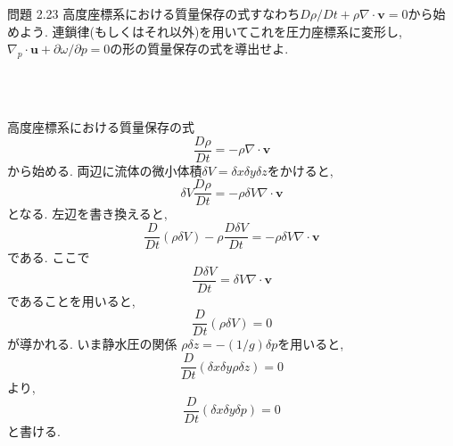 \documentclass[a4j,12pt,openbib,oneside,dvipdfmx]{jarticle}
\def\theequation{\arabic{chapter}.\arabic{equation}}
\def\thepage{\arabic{page}}
\begin{document}
\def\theequation{\arabic{equation}}
\setcounter{equation}{0}
\renewcommand{\thepage}{223-\arabic{page}}
\setcounter{page}{1}

\begin{itembox}[l]{問題 2.23}
高度座標系における質量保存の式すなわち$D\rho/Dt+\rho\nabla\cdot\bm{v}=0$から始めよう. 連鎖律(もしくはそれ以外)を用いてこれを圧力座標系に変形し, $\nabla_p\cdot\bm{u}+\partial{\omega}/\partial{p}=0$の形の質量保存の式を導出せよ.
\end{itembox}
\\
\\
\par
高度座標系における質量保存の式
\begin{equation}
  \frac{D\rho}{Dt}=-\rho\nabla\cdot\bm{v} \label{mas}
\end{equation}
から始める. 両辺に流体の微小体積$\delta{V}=\delta{x}\delta{y}\delta{z}$をかけると,
\begin{equation}
  \delta{V}\frac{D\rho}{Dt}=-\rho\delta{V}\nabla\cdot\bm{v}
\end{equation}
となる. 左辺を書き換えると, 
\begin{equation}
  \frac{D}{Dt}(\rho\delta{V})-\rho\frac{D\delta{V}}{Dt}=-\rho\delta{V}\nabla\cdot\bm{v}
\end{equation}
である. ここで
\begin{equation}
  \frac{D\delta{V}}{Dt}=\delta{V}\nabla\cdot\bm{v}
\end{equation}
であることを用いると,
\begin{equation}
  \frac{D}{Dt}(\rho\delta{V})=0 \label{mass}
\end{equation}
が導かれる. いま静水圧の関係 $\rho\delta{z}=-(1/g)\delta{p}$を用いると,
\begin{equation}
  \frac{D}{Dt}(\delta{x}\delta{y}\rho\delta{z})=0
\end{equation}
より,
\begin{equation}
  \frac{D}{Dt}(\delta{x}\delta{y}\delta{p})=0 \label{r}
\end{equation}
と書ける. \\
\end{document}
